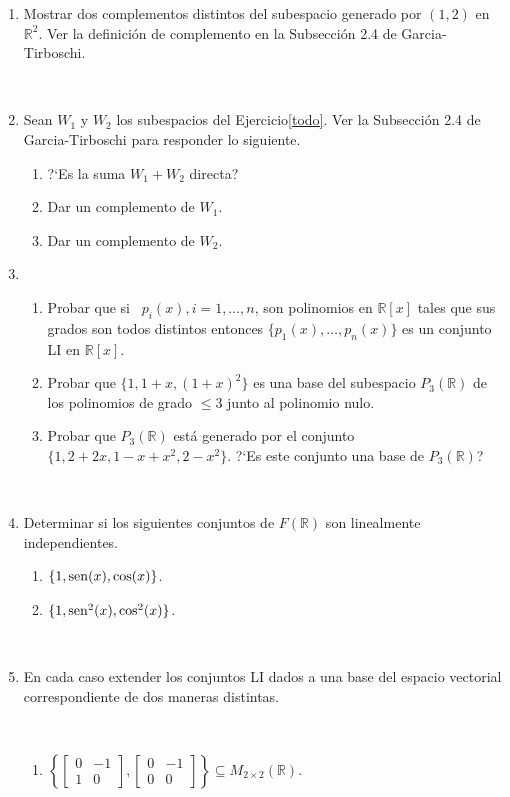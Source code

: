 \documentclass[12pt]{amsart}
\begin{document}
\begin{enumerate}[resume]
	\item
	Mostrar dos complementos distintos del subespacio generado por $(1,2)$ en ${\mathbb{R}}^2$. Ver la definici\'on de complemento en la Subsecci\'on 2.4 de Garcia-Tirboschi.

	\
	
\item Sean $W_1$ y $W_2$ los subespacios del Ejercicio\eqref{todo}. Ver la Subsecci\'on 2.4 de Garcia-Tirboschi para responder lo siguiente.

\begin{enumerate}
\item  ?`Es la suma $W_1+W_2$ directa?
\item  Dar un complemento de $W_1$.
\item  Dar un complemento de $W_2$.
\end{enumerate}

\item 
\begin{enumerate}
	\item Probar que si \ $p_i(x), i = 1, \ldots , n$, son polinomios en $\mathbb{R}[x]$ tales que sus grados son todos distintos entonces $\{p_1(x), \ldots ,p_n(x)\}$ es un conjunto LI en $\mathbb{R}[x]$.
	\item Probar que $\{1 ,1 + x, (1 +x)^2\}$ es una base del subespacio $P_3(\mathbb R)$  de los polinomios de grado $\leq 3$ junto al polinomio nulo.
	\item Probar que  $P_3(\mathbb R)$ está generado por el conjunto $\{1, 2 + 2x, 1 - x + x^2, 2 - x^2\}$.
	?`Es este conjunto una base de $P_3(\mathbb R)$?
\end{enumerate}

\

\item Determinar si los siguientes conjuntos de $F(\mathbb{R})$ son linealmente independientes.

\begin{enumerate}
	\item $\{1,{\rm sen}(x),\cos(x)\}$.
	\item $\{1,{\rm sen}^2(x),\cos^2(x)\}$.
\end{enumerate}

\
\item En cada caso extender los conjuntos LI dados a una base del espacio vectorial correspondiente de dos maneras distintas.

\


\begin{enumerate}
	\item $\left\{ \begin{bmatrix} 0 & -1 \\ 1 & 0 \end{bmatrix}, \begin{bmatrix} 0 & -1 \\ 0 & 0 \end{bmatrix} \right\}
	\subseteq M_{2\times 2}(\mathbb{R})$.
	

\end{enumerate}
\end{enumerate}
\end{document}
